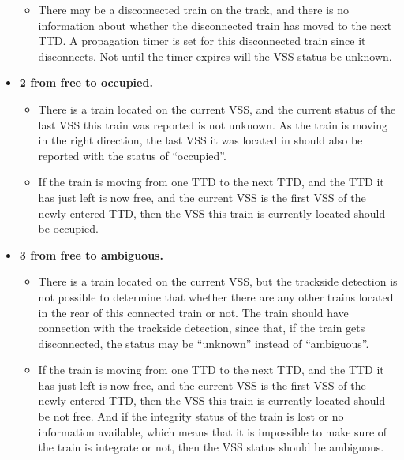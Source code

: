 \documentclass[article,dr=phil,type=drfinal,colorback,accentcolor=tud9c]{tudthesis}
\begin{document}
\begin{itemize}
\begin{itemize}
  	\item 
  	
  	There may be a disconnected train on the track, and there is no information about whether the disconnected train has moved to the next TTD. A propagation timer is set for this disconnected train since it disconnects. Not until the timer expires will the VSS status be unknown.
  		
    \end{itemize}	
  	
  	\item \textbf{2 from free to occupied.}
  	
  	\begin{itemize}
  		
  	\item 
  	
  	There is a train located on the current VSS, and the current status of the last VSS this train was reported is not unknown. As the train is moving in the right direction, the last VSS it was located in should also be reported with the status of ``occupied''.
  	
  	\item 
  	
  	If the train is moving from one TTD to the next TTD, and the TTD it has just left is now free, and the current VSS is the first VSS of the newly-entered TTD, then the VSS this train is currently located should be occupied.
  		
    \end{itemize}		
  		
  	\item \textbf{3 from free to ambiguous.}
  	
  	\begin{itemize}
	
	\item 
	
	There is a train located on the current VSS, but the trackside detection is not possible to determine that whether there are any other trains located in the rear of this connected train or not. The train should have connection with the trackside detection, since that, if the train gets disconnected, the status may be ``unknown'' instead of ``ambiguous''.
	
	\item 
	
    If the train is moving from one TTD to the next TTD, and the TTD it has just left is now free, and the current VSS is the first VSS of the newly-entered TTD, then the VSS this train is currently located should be not free. And if the integrity status of the train is lost or no information available, which means that it is impossible to make sure of the train is integrate or not, then the VSS status should be ambiguous.
	

\end{itemize}
\end{itemize}
\end{document}
